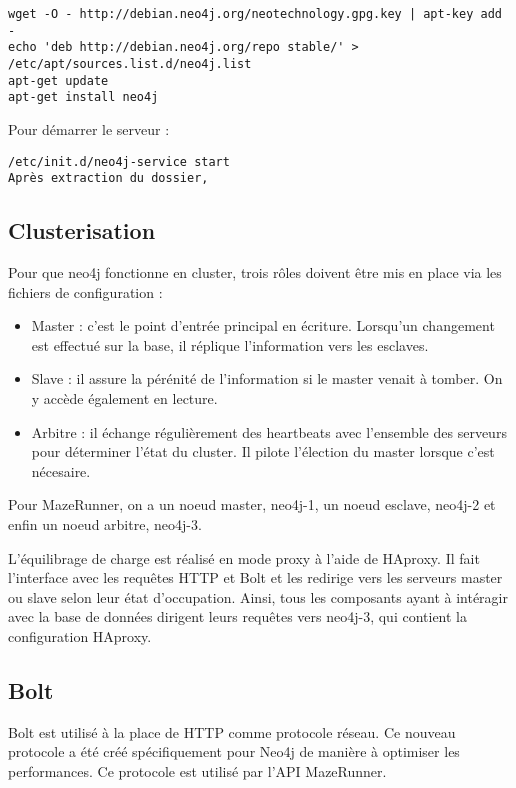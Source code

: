 \begin{lstlisting}
wget -O - http://debian.neo4j.org/neotechnology.gpg.key | apt-key add -
echo 'deb http://debian.neo4j.org/repo stable/' > /etc/apt/sources.list.d/neo4j.list
apt-get update
apt-get install neo4j
\end{lstlisting}

Pour démarrer le serveur :
\begin{lstlisting}
/etc/init.d/neo4j-service start
Après extraction du dossier, 
\end{lstlisting}

\subsection{Clusterisation}

Pour que neo4j fonctionne en cluster, trois rôles doivent être mis en place via les fichiers de configuration :

\begin{itemize}
      \item Master : c'est le point d'entrée principal en écriture. Lorsqu'un changement est effectué sur la base, il réplique l'information vers les esclaves.
      \item Slave : il assure la pérénité de l'information si le master venait à tomber. On y accède également en lecture.
      \item Arbitre : il échange régulièrement des heartbeats avec l'ensemble des serveurs pour déterminer l'état du cluster. Il pilote l'élection du master lorsque c'est nécesaire.
\end{itemize}

Pour MazeRunner, on a un noeud master, neo4j-1, un noeud esclave, neo4j-2 et enfin un noeud arbitre, neo4j-3.

L'équilibrage de charge est réalisé en mode proxy à l'aide de HAproxy. Il fait l'interface avec les requêtes HTTP et Bolt et les redirige vers les serveurs master ou slave selon leur état d'occupation. Ainsi, tous les composants ayant à intéragir avec la base de données dirigent leurs requêtes vers neo4j-3, qui contient la configuration HAproxy.

\subsection{Bolt}

Bolt est utilisé à la place de HTTP comme protocole réseau. Ce nouveau protocole a été créé spécifiquement pour Neo4j de manière à optimiser les performances. Ce protocole est utilisé par l'API MazeRunner.

